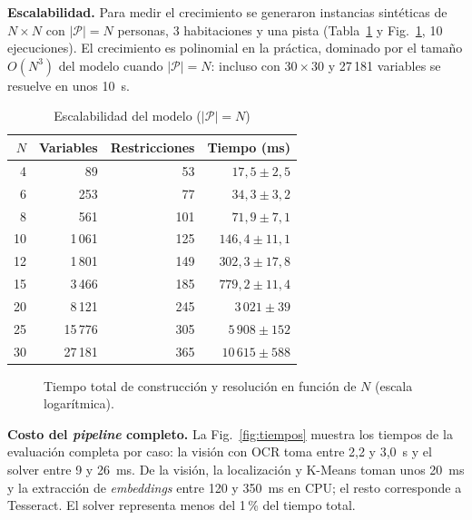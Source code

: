 \documentclass[conference,a4paper]{IEEEtran}
\begin{document}
\textbf{Escalabilidad.} Para medir el crecimiento se generaron instancias sintéticas de
$N\times N$ con $|\mathcal{P}|=N$ personas, 3 habitaciones y una pista
(Tabla~\ref{tab:escala} y Fig.~\ref{fig:escala}, 10 ejecuciones). El crecimiento es
polinomial en la práctica, dominado por el tamaño $O(N^3)$ del modelo cuando
$|\mathcal{P}|=N$: incluso con $30\times30$ y 27\,181 variables se resuelve en unos 10~s.

\begin{table}[t]
\centering
\caption{Escalabilidad del modelo ($|\mathcal{P}|=N$)}
\label{tab:escala}
\begin{tabular}{rrrr}
\toprule
$N$ & \textbf{Variables} & \textbf{Restricciones} & \textbf{Tiempo (ms)}\\
\midrule
4  & 89      & 53  & $17{,}5\pm2{,}5$\\
6  & 253     & 77  & $34{,}3\pm3{,}2$\\
8  & 561     & 101 & $71{,}9\pm7{,}1$\\
10 & 1\,061  & 125 & $146{,}4\pm11{,}1$\\
12 & 1\,801  & 149 & $302{,}3\pm17{,}8$\\
15 & 3\,466  & 185 & $779{,}2\pm11{,}4$\\
20 & 8\,121  & 245 & $3\,021\pm39$\\
25 & 15\,776 & 305 & $5\,908\pm152$\\
30 & 27\,181 & 365 & $10\,615\pm588$\\
\bottomrule
\end{tabular}
\end{table}

\begin{figure}[t]
\centering
{}
\caption{Tiempo total de construcción y resolución en función de $N$ (escala logarítmica).}
\label{fig:escala}
\end{figure}

\textbf{Costo del \emph{pipeline} completo.} La Fig.~\ref{fig:tiempos} muestra los tiempos
de la evaluación completa por caso: la visión con OCR toma entre 2,2 y 3,0~s y el solver
entre 9 y 26~ms. De la visión, la localización y K-Means toman unos 20~ms y la extracción de
\emph{embeddings} entre 120 y 350~ms en CPU; el resto corresponde a Tesseract. El solver
representa menos del 1\,\% del tiempo total.
\end{document}
